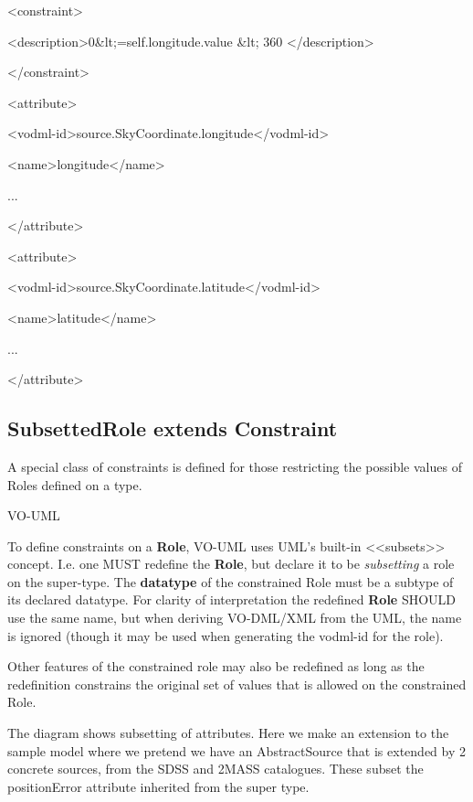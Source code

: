 \documentclass[10pt,a4paper]{ivoa}
\begin{document}
\textless constraint\textgreater{}

\textless description\textgreater0\&lt;=self.longitude.value \&lt; 360
\textless/description\textgreater{}

\textless/constraint\textgreater{}

\textless attribute\textgreater{}

\textless vodml-id\textgreater source.SkyCoordinate.longitude\textless/vodml-id\textgreater{}

\textless name\textgreater longitude\textless/name\textgreater{}

...

\textless/attribute\textgreater{}

\textless attribute\textgreater{}

\textless vodml-id\textgreater source.SkyCoordinate.latitude\textless/vodml-id\textgreater{}

\textless name\textgreater latitude\textless/name\textgreater{}

...

\textless/attribute\textgreater{}

\hypertarget{subsettedrole-extends-constraint}{%
\subsection{SubsettedRole extends
Constraint}\label{subsettedrole-extends-constraint}}

A special class of constraints is defined for those restricting the
possible values of Roles defined on a type.

VO-UML

To define constraints on a \textbf{Role}, VO-UML uses UML's built-in
\textless\textless subsets\textgreater\textgreater{} concept. I.e. one
MUST redefine the \textbf{Role}, but declare it to be \emph{subsetting}
a role on the super-type. The \textbf{datatype} of the constrained Role
must be a subtype of its declared datatype. For clarity of
interpretation the redefined \textbf{Role} SHOULD use the same name, but
when deriving VO-DML/XML from the UML, the name is ignored (though it
may be used when generating the vodml-id for the role).

Other features of the constrained role may also be redefined as long as
the redefinition constrains the original set of values that is allowed
on the constrained Role.

The diagram shows subsetting of attributes. Here we make an extension to
the sample model where we pretend we have an AbstractSource that is
extended by 2 concrete sources, from the SDSS and 2MASS catalogues.
These subset the positionError attribute inherited from the super type.
\end{document}
